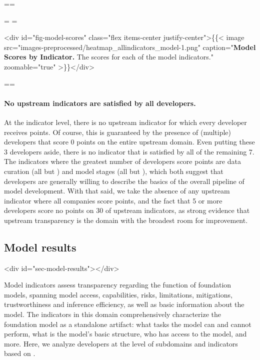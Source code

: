 \documentclass[screen, authorversion, acmsmall]{acmart}
\begin{document}
\clearpage
\eject
\pdfpagewidth=\originalwidth \pdfpageheight=\originalheight
{}



\eject
\pdfpageheight=\originalwidth
\setlength{\mylength}{\originalheight-3.4cm}
\pdfpagewidth=\mylength
{}

<div id="fig-model-scores" class="flex items-center justify-center">\{\{< image src="images-preprocessed/heatmap_allindicators_model-1.png" caption="\textbf{Model Scores by Indicator.} The scores for each of the \nummodelindicators model indicators." zoomable="true" >\}\}</div>



\clearpage
\eject
\pdfpagewidth=\originalwidth \pdfpageheight=\originalheight
{}


\paragraph{No upstream indicators are satisfied by all developers.}
At the indicator level, there is no upstream indicator for which every developer receives points.
Of course, this is guaranteed by the presence of (multiple) developers that score 0 points on the entire upstream domain.
Even putting these 3 developers aside, there is no indicator that is satisfied by all of the remaining 7.
The indicators where the greatest number of developers score points are data curation (all but \anthropic) and model stages (all but \cohere), which both suggest that developers are generally willing to describe the basics of the overall pipeline of model development.
With that said, we take the absence of any upstream indicator where all companies score points, and the fact that 5 or more developers score no points on 30 of \numupstreamindicators upstream indicators, as strong evidence that upstream transparency is the domain with the broadest room for improvement.

\hypertarget{model-results}{\subsection{Model results}}
<div id="sec-model-results"></div>


Model indicators assess transparency regarding the function of foundation models, spanning model access, capabilities, risks, limitations, mitigations, trustworthiness and inference efficiency, as well as basic information about the model. 
The indicators in this domain comprehensively characterize the foundation model as a standalone artifact: what tasks the model can and cannot perform, what is the model's basic structure, who has access to the model, and more. 
Here, we analyze developers at the level of subdomains and indicators based on .
\end{document}

